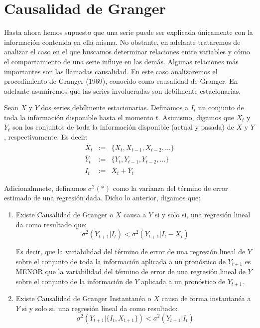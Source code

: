 \documentclass[
]{book}
\begin{document}
\hypertarget{causalidad-de-granger}{%
\section{Causalidad de Granger}\label{causalidad-de-granger}}

Hasta ahora hemos supuesto que una serie puede ser explicada únicamente con la información contenida en ella misma. No obstante, en adelante trataremos de analizar el caso en el que buscamos determinar relaciones entre variables y cómo el comportamiento de una serie influye en las demás. Algunas relaciones más importantes son las llamadas causalidad. En este caso analizaremos el procedimiento de Granger (1969), conocido como causalidad de Granger. En adelante asumiremos que las series involucradas son debílmente estacionarias.

Sean \(X\) y \(Y\) dos series debílmente estacionarias. Definamos a \(I_t\) un conjunto de toda la información disponible hasta el momento \(t\). Asimismo, digamos que \(\overline{X}_t\) y \(\overline{Y}_t\) son los conjuntos de toda la información disponible (actual y pasada) de \(X\) y \(Y\), respectivamente. Es decir:
\begin{eqnarray*}
    \overline{X}_t & := & \{ X_t, X_{t-1}, X_{t-2}, \ldots \} \\
    \overline{Y}_t & := & \{ Y_t, Y_{t-1}, Y_{t-2}, \ldots \} \\
    I_t & := & \overline{X}_t + \overline{Y}_t
\end{eqnarray*}

Adicionalmnete, definamos \(\sigma^2(*)\) como la varianza del término de error estimado de una regresión dada. Dicho lo anterior, digamos que:

\begin{enumerate}

\item Existe Causalidad de Granger o $X$ causa a $Y$ si y solo si, una regresión lineal da como resultado que: 
    \begin{equation}
        \sigma^2 (Y_{t+1} | I_t) < \sigma^2 (Y_{t+1} | I_t - X_t)    
    \end{equation}

Es decir, que la variabilidad del término de error de una regresión lineal de $Y$ sobre el conjunto de toda la información aplicada a un pronóstico de $Y_{t+1}$ es MENOR que la variabilidad del término de error de una regresión lineal de $Y$ sobre el conjunto de la información de $Y$ aplicada a un pronóstico de $Y_{t+1}$.

\item Existe Causalidad de Granger Instantanéa o $X$ causa de forma instantanéa a $Y$ si y solo si, una regresión lineal da como resultado:
    \begin{equation}
        \sigma^2 (Y_{t+1} | \{ I_t, X_{t+1} \}) < \sigma^2 (Y_{t+1} | I_t)
    \end{equation}

\end{enumerate}
\end{document}
